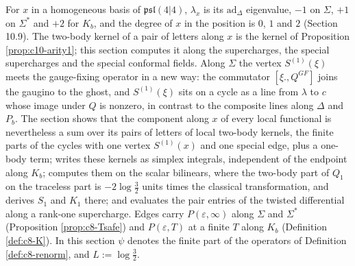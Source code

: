 For $x$ in a homogeneous basis of $\mathfrak{psl}(4|4)$, $\lambda_x$ is its $\mathrm{ad}_\Delta$ eigenvalue, $-1$ on $\Sigma$, $+1$ on $\Sigma^*$ and $+2$ for $K_b$, and the degree of $x$ in the position is $0$, $1$ and $2$ (Section 10.9). The two-body kernel of a pair of letters along $x$ is the kernel of Proposition \ref{prop:c10-arity1}; this section computes it along the supercharges, the special supercharges and the special conformal fields. Along $\Sigma$ the vertex $S^{(1)}(\xi)$ meets the gauge-fixing operator in a new way: the commutator $[\xi.,Q^{GF}]$ joins the gaugino to the ghost, and $S^{(1)}(\xi)$ sits on a cycle as a line from $\lambda$ to $c$ whose image under $Q$ is nonzero, in contrast to the composite lines along $\Delta$ and $P_b$. The section shows that the component along $x$ of every local functional is nevertheless a sum over its pairs of letters of local two-body kernels, the finite parts of the cycles with one vertex $S^{(1)}(x)$ and one special edge, plus a one-body term; writes these kernels as simplex integrals, independent of the endpoint along $K_b$; computes them on the scalar bilinears, where the two-body part of $Q_1$ on the traceless part is $-2\log\tfrac32$ units times the classical transformation, and derives $S_1$ and $K_1$ there; and evaluates the pair entries of the twisted differential along a rank-one supercharge. Edges carry $P(\varepsilon,\infty)$ along $\Sigma$ and $\Sigma^*$ (Proposition \ref{prop:c8-Tsafe}) and $P(\varepsilon,T)$ at a finite $T$ along $K_b$ (Definition \ref{def:c8-K}). In this section $\psi$ denotes the finite part of the operators of Definition \ref{def:c8-renorm}, and $L:=\log\tfrac32$.

